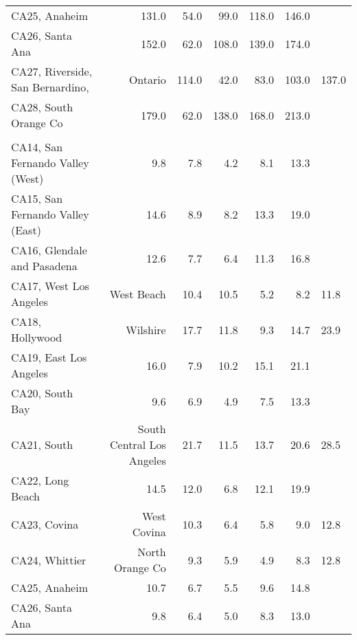 \begin{longtable}[l]{l|rrrrr}
\hspace{1em}CA25, Anaheim & 131.0 & 54.0 & 99.0 & 118.0 & 146.0\\
\hspace{1em}CA26, Santa Ana & 152.0 & 62.0 & 108.0 & 139.0 & 174.0\\
\hspace{1em}CA27, Riverside, San Bernardino, & Ontario & 114.0 & 42.0 & 83.0 & 103.0 & 137.0\\
\hspace{1em}CA28, South Orange Co & 179.0 & 62.0 & 138.0 & 168.0 & 213.0\\
\addlinespace[0.5em]
\\
\hspace{1em}CA14, San Fernando Valley (West) & 9.8 & 7.8 & 4.2 & 8.1 & 13.3\\
\hspace{1em}CA15, San Fernando Valley (East) & 14.6 & 8.9 & 8.2 & 13.3 & 19.0\\
\hspace{1em}CA16, Glendale and Pasadena & 12.6 & 7.7 & 6.4 & 11.3 & 16.8\\
\hspace{1em}CA17, West Los Angeles & West Beach & 10.4 & 10.5 & 5.2 & 8.2 & 11.8\\
\hspace{1em}CA18, Hollywood & Wilshire & 17.7 & 11.8 & 9.3 & 14.7 & 23.9\\
\hspace{1em}CA19, East Los Angeles & 16.0 & 7.9 & 10.2 & 15.1 & 21.1\\
\hspace{1em}CA20, South Bay & 9.6 & 6.9 & 4.9 & 7.5 & 13.3\\
\hspace{1em}CA21, South & South Central Los Angeles & 21.7 & 11.5 & 13.7 & 20.6 & 28.5\\
\hspace{1em}CA22, Long Beach & 14.5 & 12.0 & 6.8 & 12.1 & 19.9\\
\hspace{1em}CA23, Covina & West Covina & 10.3 & 6.4 & 5.8 & 9.0 & 12.8\\
\hspace{1em}CA24, Whittier & North Orange Co & 9.3 & 5.9 & 4.9 & 8.3 & 12.8\\
\hspace{1em}CA25, Anaheim & 10.7 & 6.7 & 5.5 & 9.6 & 14.8\\
\hspace{1em}CA26, Santa Ana & 9.8 & 6.4 & 5.0 & 8.3 & 13.0\\

\end{longtable}
